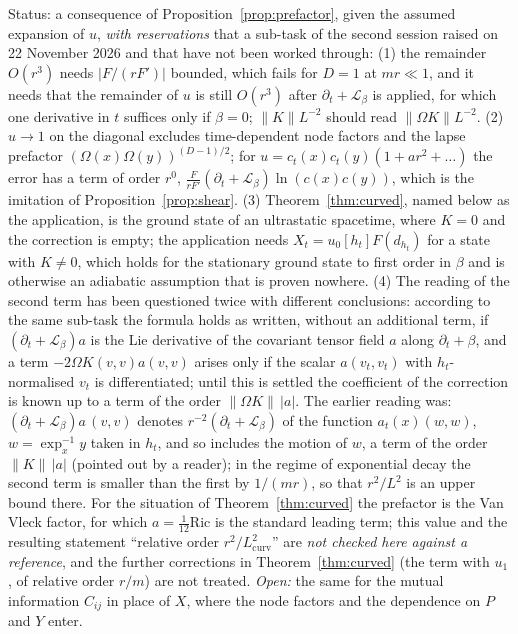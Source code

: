 \documentclass[11pt,a4paper]{article}
\theoremstyle{stmt}
\theoremstyle{defn}
\theoremstyle{rmk}
\numberwithin{equation}{section}
\newcommand{\Lie}{\mathcal{L}}
\newcommand{\status}[1]{\par\noindent\textsf{\small Status: #1}\par}
\begin{document}
{\status{a consequence of Proposition~\ref{prop:prefactor}, given the assumed expansion of $u$, \emph{with reservations} that a sub-task of the second session raised on 22 November 2026 and that have not been worked through: (1) the remainder $O(r^3)$ needs $|F/(rF')|$ bounded, which fails for $D=1$ at $mr\ll1$, and it needs that the remainder of $u$ is still $O(r^3)$ after $\partial_t+\Lie_\beta$ is applied, for which one derivative in $t$ suffices only if $\beta=0$; $\|K\|L^{-2}$ should read $\|\Omega K\|L^{-2}$. (2) $u\to1$ on the diagonal excludes time-dependent node factors and the lapse prefactor $(\Omega(x)\Omega(y))^{(D-1)/2}$; for $u=c_t(x)c_t(y)(1+ar^2+\dots)$ the error has a term of order $r^0$, $\frac{F}{rF'}(\partial_t+\Lie_\beta)\ln(c(x)c(y))$, which is the imitation of Proposition~\ref{prop:shear}. (3) Theorem~\ref{thm:curved}, named below as the application, is the ground state of an ultrastatic spacetime, where $K=0$ and the correction is empty; the application needs $X_t=u_0[h_t]F(d_{h_t})$ for a state with $K\ne0$, which holds for the stationary ground state to first order in $\beta$ and is otherwise an adiabatic assumption that is proven nowhere. (4) The reading of the second term has been questioned twice with different conclusions: according to the same sub-task the formula holds as written, without an additional term, if $(\partial_t+\Lie_\beta)a$ is the Lie derivative of the covariant tensor field $a$ along $\partial_t+\beta$, and a term $-2\Omega K(v,v)a(v,v)$ arises only if the scalar $a(v_t,v_t)$ with $h_t$-normalised $v_t$ is differentiated; until this is settled the coefficient of the correction is known up to a term of the order $\|\Omega K\|\,|a|$. The earlier reading was: $(\partial_t+\Lie_\beta)a\,(v,v)$ denotes $r^{-2}(\partial_t+\Lie_\beta)$ of the function $a_t(x)(w,w)$, $w=\exp_x^{-1}y$ taken in $h_t$, and so includes the motion of $w$, a term of the order $\|K\|\,|a|$ (pointed out by a reader); in the regime of exponential decay the second term is smaller than the first by $1/(mr)$, so that $r^2/L^2$ is an upper bound there. For the situation of Theorem~\ref{thm:curved} the prefactor is the Van Vleck factor, for which $a=\tfrac1{12}\mathrm{Ric}$ is the standard leading term; this value and the resulting statement ``relative order $r^2/L_{\mathrm{curv}}^2$'' are \emph{not checked here against a reference}, and the further corrections in Theorem~\ref{thm:curved} (the term with $u_1$, of relative order $r/m$) are not treated. \emph{Open:} the same for the mutual information $C_{ij}$ in place of $X$, where the node factors and the dependence on $P$ and $Y$ enter.}

}
\end{document}
